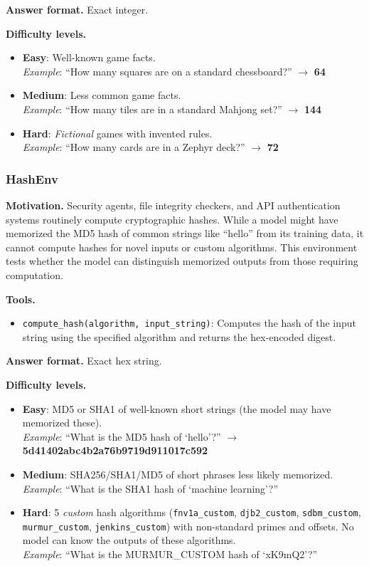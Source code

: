 \textbf{Answer format.} Exact integer.

\textbf{Difficulty levels.}
\begin{itemize}
    \item \textbf{Easy}: Well-known game facts.\\
    \emph{Example}: ``How many squares are on a standard chessboard?'' $\to$ \textbf{64}
    \item \textbf{Medium}: Less common game facts.\\
    \emph{Example}: ``How many tiles are in a standard Mahjong set?'' $\to$ \textbf{144}
    \item \textbf{Hard}: \emph{Fictional} games with invented rules.\\
    \emph{Example}: ``How many cards are in a Zephyr deck?'' $\to$ \textbf{72}
\end{itemize}

\subsubsection{HashEnv}

\textbf{Motivation.}
Security agents, file integrity checkers, and API authentication systems routinely compute cryptographic hashes. While a model might have memorized the MD5 hash of common strings like ``hello'' from its training data, it cannot compute hashes for novel inputs or custom algorithms. This environment tests whether the model can distinguish memorized outputs from those requiring computation.

\textbf{Tools.}
\begin{itemize}
    \item \texttt{compute\_hash(algorithm, input\_string)}: Computes the hash of the input string using the specified algorithm and returns the hex-encoded digest.
\end{itemize}

\textbf{Answer format.} Exact hex string.

\textbf{Difficulty levels.}
\begin{itemize}
    \item \textbf{Easy}: MD5 or SHA1 of well-known short strings (the model may have memorized these).\\
    \emph{Example}: ``What is the MD5 hash of `hello'?'' $\to$ \textbf{5d41402abc4b2a76b9719d911017c592}
    \item \textbf{Medium}: SHA256/SHA1/MD5 of short phrases less likely memorized.\\
    \emph{Example}: ``What is the SHA1 hash of `machine learning'?''
    \item \textbf{Hard}: 5 \emph{custom} hash algorithms (\texttt{fnv1a\_custom}, \texttt{djb2\_custom}, \texttt{sdbm\_custom}, \texttt{murmur\_custom}, \texttt{jenkins\_custom}) with non-standard primes and offsets. No model can know the outputs of these algorithms.\\
    \emph{Example}: ``What is the MURMUR\_CUSTOM hash of `xK9mQ2'?''
\end{itemize}

